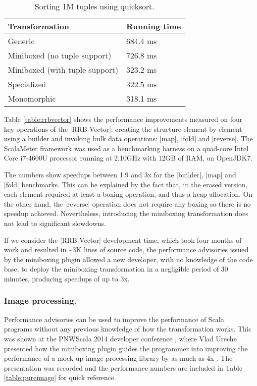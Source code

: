 \begin{table}[t]
  \begin{tabularx}{0.48\textwidth}{|g *{1}{|Y}|} \hline
    \textbf{Transformation} & \textbf{Running time}  \\ \hline
    Generic                        &              684.4 ms  \\
    Miniboxed (no tuple support)   &              726.8 ms  \\
    Miniboxed (with tuple support) &              323.2 ms  \\
    Specialized                    &              322.5 ms  \\
    Monomorphic                    &              318.1 ms  \\ \hline
  \end{tabularx}

  \caption{Sorting 1M tuples using quicksort.}
  \label{table:tuple}

\end{table}


Table \ref{table:rrbvector} shows the performance improvements measured on four key operations of the |RRB-Vector|: creating the structure element by element using a builder and invoking bulk data operations: |map|, |fold| and |reverse|. The ScalaMeter framework \cite{scalameter} was used as a benchmarking harness on a quad-core Intel Core i7-4600U processor running at 2.10GHz with 12GB of RAM, on OpenJDK7. %

The numbers show speedups between 1.9 and 3x for the |builder|, |map| and |fold| benchmarks. This can be explained by the fact that, in the erased version, each element required at least a boxing operation, and thus a heap allocation. On the other hand, the |reverse| operation does not require any boxing so there is no speedup achieved. Nevertheless, introducing the miniboxing transformation does not lead to significant slowdowns.

If we consider the |RRB-Vector| development time, which took four months of work and resulted in \textasciitilde3K lines of source code, the performance advisories issued by the miniboxing plugin allowed a new developer, with no knowledge of the code base, to deploy the miniboxing transformation in a negligible period of 30 minutes, producing speedups of up to 3x.



\subsubsection{Image processing.} Performance advisories can be used to improve the performance of Scala programs without any previous knowledge of how the transformation works. This was shown at the PNWScala 2014 developer conference \cite{pnwscala-conf}, where Vlad Ureche presented how the miniboxing plugin guides the programmer into improving the performance of a mock-up image processing library by as much as 4x \cite{pnwscala-pureimage}. The presentation was recorded and the performance numbers are included in Table \ref{table:pureimage} for quick reference.




